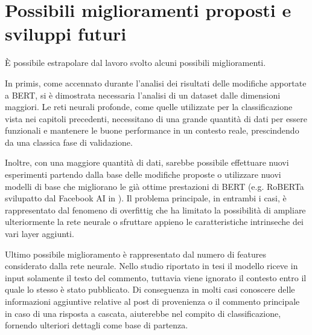 \section{Possibili miglioramenti proposti e sviluppi futuri}
È possibile estrapolare dal lavoro svolto alcuni possibili miglioramenti.

In primis, come accennato durante l'analisi dei risultati delle modifiche apportate a BERT, si è dimostrata necessaria l'analisi di un dataset dalle dimensioni maggiori. Le reti neurali profonde, come quelle utilizzate per la classificazione vista nei capitoli precedenti, necessitano di una grande quantità di dati per essere funzionali e mantenere le buone performance in un contesto reale, prescindendo da una classica fase di validazione.

Inoltre, con una maggiore quantità di dati, sarebbe possibile effettuare nuovi esperimenti partendo dalla base delle modifiche proposte o utilizzare nuovi modelli di base che migliorano le già ottime prestazioni di BERT (e.g. RoBERTa svilupatto dal Facebook AI in \cite{roberta}). Il problema principale, in entrambi i casi, è rappresentato dal fenomeno di overfittig che ha limitato la possibilità di ampliare ulteriormente la rete neurale o sfruttare appieno le caratteristiche intrinseche dei vari layer aggiunti.

Ultimo possibile miglioramento è rappresentato dal numero di features considerato dalla rete neurale. Nello studio riportato in tesi il modello riceve in input solamente il testo del commento, tuttavia viene ignorato il contesto entro il quale lo stesso è stato pubblicato. Di conseguenza in molti casi conoscere delle informazioni aggiuntive relative al post di provenienza o il commento principale in caso di una risposta a cascata, aiuterebbe nel compito di classificazione, fornendo ulteriori dettagli come base di partenza.
